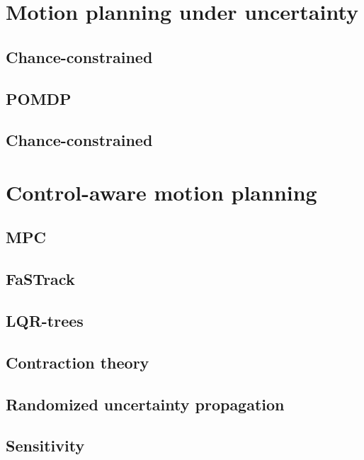 

\section{Motion planning under uncertainty}

\subsection{Chance-constrained}

\subsection{POMDP}

\subsection{Chance-constrained}

\section{Control-aware motion planning}

\subsection{MPC}

\subsection{FaSTrack}

\subsection{LQR-trees}

\subsection{Contraction theory}

\subsection{Randomized uncertainty propagation}

\subsection{Sensitivity}